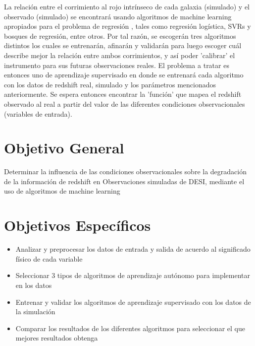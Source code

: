 \documentclass[12pt]{article}
\begin{document}
La relación entre el corrimiento al rojo intr\'inseco de cada galaxia
(simulado) y el observado (simulado) se encontrará usando algoritmos de machine
learning apropiados para el problema de regresión
\cite{bishop2006pattern}, tales como regresión logística, SVRs y bosques de regresión, entre otros. Por tal razón, se escogerán tres algoritmos
distintos los cuales se entrenarán, afinarán y validarán para luego
escoger cuál describe mejor la relación entre ambos corrimientos, y
así poder 'calibrar' el instrumento para sus futuras observaciones
reales. El problema a tratar es entonces uno de aprendizaje
supervisado en donde se entrenará cada algoritmo con los datos de
redshift real, simulado y los parámetros mencionados anteriormente. Se
espera entonces encontrar la 'función' que mapea el redshift observado
al real a partir del valor de las diferentes condiciones
observacionales (variables de entrada).  







\section{Objetivo General}


Determinar la influencia de las condiciones observacionales sobre la
degradación de la información de redshift en Observaciones simuladas
de DESI, mediante el uso de algoritmos de machine learning 
 
\section{Objetivos Específicos}


\begin{itemize}
	\item Analizar y preprocesar los datos de entrada y salida de acuerdo al significado físico de cada variable
	\item Seleccionar 3 tipos de algoritmos de aprendizaje autónomo para implementar en los datos
	\item Entrenar y validar los algoritmos de aprendizaje
          supervisado con los datos de la simulación
	\item Comparar los resultados de los diferentes algoritmos
          para seleccionar el que mejores resultados obtenga 
\end{itemize}
\end{document}
